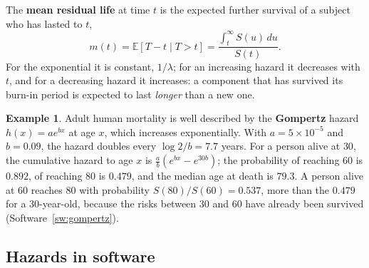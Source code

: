 \documentclass[11pt,a4paper]{article}
\numberwithin{equation}{section}
\theoremstyle{definition}
\newtheorem{exa}[thm]{Example}
\begin{document}
The \textbf{mean residual life} at time $t$ is the expected further survival of a subject who has lasted to $t$,
\[
m(t) = \mathbb E[T - t \mid T > t] = \frac{\int_t^\infty S(u)\,du}{S(t)} .
\]
For the exponential it is constant, $1/\lambda$; for an increasing hazard it decreases with $t$, and for a decreasing hazard it increases: a component that has survived its burn-in period is expected to last \emph{longer} than a new one.

\begin{exa}
\label{ex:gompertz}
Adult human mortality is well described by the \textbf{Gompertz} hazard $h(x) = ae^{bx}$ at age $x$, which increases exponentially. With $a = 5 \times 10^{-5}$ and $b = 0.09$, the hazard doubles every $\log 2/b = 7.7$ years. For a person alive at $30$, the cumulative hazard to age $x$ is $\frac ab(e^{bx} - e^{30b})$; the
probability of reaching $60$ is $0.892$, of reaching $80$ is $0.479$, and the median age at death is $79.3$. A person alive at $60$ reaches $80$ with probability $S(80)/S(60) = 0.537$, more than the $0.479$ for a $30$-year-old, because the risks between $30$ and $60$ have already been survived (Software~\ref{sw:gompertz}).
\end{exa}

\subsection{Hazards in software}
\label{ssec:software2}
\end{document}
